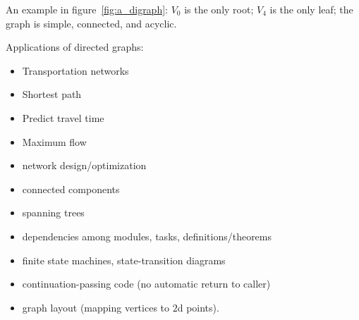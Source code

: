 \documentclass[11pt,openany]{book}
\begin{document}
An example in figure~\ref{fig:a_digraph}:
$V_0$ is the only root; $V_4$ is the only leaf;
the graph is simple, connected, and acyclic.

Applications of directed graphs:~\cite{CormenLeisersonRivestStein:2009:Algorithms}
\begin{itemize}
  \item Transportation networks
  \item Shortest path
  \item Predict travel time
  \item Maximum flow
  \item network design/optimization
  \item connected components
  \item spanning trees
  \item dependencies among modules, tasks, definitions/theorems
  \item finite state machines, state-transition diagrams
  \item continuation-passing code (no automatic return to caller)
  \item graph layout (mapping vertices to $2$d points).
\end{itemize}

\label{sec:Category_from_digraph}

\end{document}
